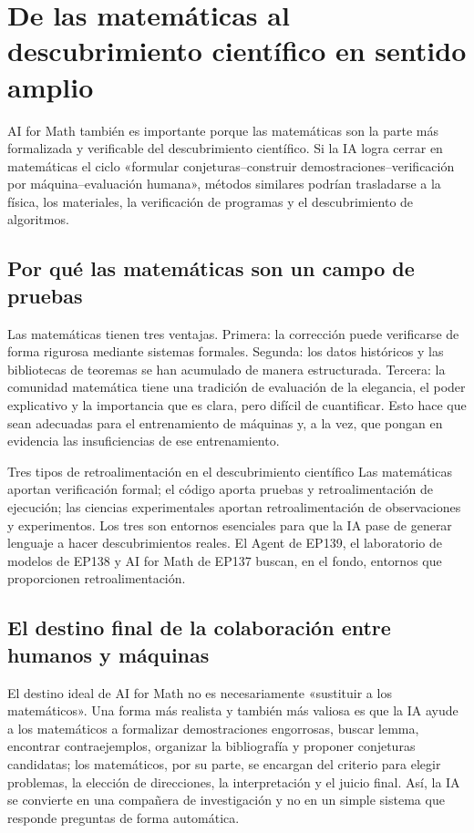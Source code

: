 \section{De las matemáticas al descubrimiento científico en sentido amplio}

AI for Math también es importante porque las matemáticas son la parte más formalizada y verificable del descubrimiento científico. Si la IA logra cerrar en matemáticas el ciclo «formular conjeturas--construir demostraciones--verificación por máquina--evaluación humana», métodos similares podrían trasladarse a la física, los materiales, la verificación de programas y el descubrimiento de algoritmos.

\subsection{Por qué las matemáticas son un campo de pruebas}

Las matemáticas tienen tres ventajas. Primera: la corrección puede verificarse de forma rigurosa mediante sistemas formales. Segunda: los datos históricos y las bibliotecas de teoremas se han acumulado de manera estructurada. Tercera: la comunidad matemática tiene una tradición de evaluación de la elegancia, el poder explicativo y la importancia que es clara, pero difícil de cuantificar. Esto hace que sean adecuadas para el entrenamiento de máquinas y, a la vez, que pongan en evidencia las insuficiencias de ese entrenamiento.

\begin{knowledgebox}{Tres tipos de retroalimentación en el descubrimiento científico}
Las matemáticas aportan verificación formal; el código aporta pruebas y retroalimentación de ejecución; las ciencias experimentales aportan retroalimentación de observaciones y experimentos. Los tres son entornos esenciales para que la IA pase de generar lenguaje a hacer descubrimientos reales. El Agent de EP139, el laboratorio de modelos de EP138 y AI for Math de EP137 buscan, en el fondo, entornos que proporcionen retroalimentación.
\end{knowledgebox}

\subsection{El destino final de la colaboración entre humanos y máquinas}

El destino ideal de AI for Math no es necesariamente «sustituir a los matemáticos». Una forma más realista y también más valiosa es que la IA ayude a los matemáticos a formalizar demostraciones engorrosas, buscar lemma, encontrar contraejemplos, organizar la bibliografía y proponer conjeturas candidatas; los matemáticos, por su parte, se encargan del criterio para elegir problemas, la elección de direcciones, la interpretación y el juicio final. Así, la IA se convierte en una compañera de investigación y no en un simple sistema que responde preguntas de forma automática.

